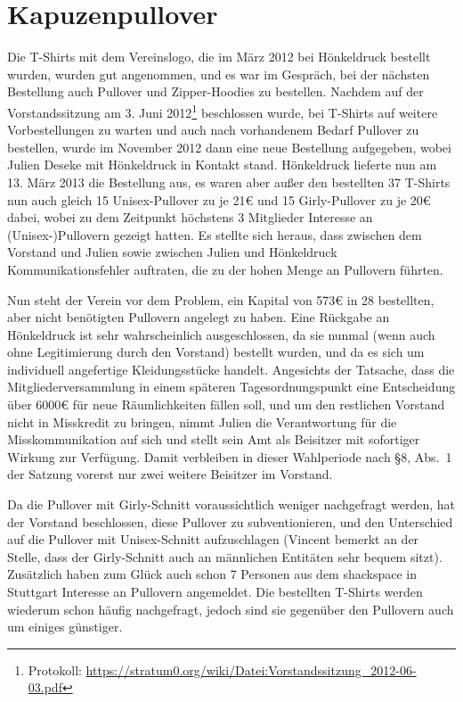 \documentclass[a4paper,12pt]{scrartcl}
\begin{document}
\section{Kapuzenpullover\label{sec:pullover}}
Die T-Shirts mit dem Vereinslogo, die im März 2012 bei Hönkeldruck bestellt
wurden, wurden gut angenommen, und es war im Gespräch, bei der nächsten
Bestellung auch Pullover und Zipper-Hoodies zu bestellen. Nachdem auf der
Vorstandssitzung am 3. Juni 2012\footnote{Protokoll:
\url{https://stratum0.org/wiki/Datei:Vorstandssitzung_2012-06-03.pdf}}
beschlossen wurde, bei T-Shirts auf weitere Vorbestellungen zu warten und auch
nach vorhandenem Bedarf Pullover zu bestellen, wurde im November 2012 dann eine
neue Bestellung aufgegeben, wobei Julien Deseke mit Hönkeldruck in Kontakt
stand.  Hönkeldruck lieferte nun am 13. März 2013 die Bestellung aus, es waren
aber außer den bestellten 37 T-Shirts nun auch gleich 15 Unisex-Pullover zu je
21€ und 15 Girly-Pullover zu je 20€ dabei, wobei zu dem Zeitpunkt höchstens 3
Mitglieder Interesse an (Unisex-)Pullovern gezeigt hatten. Es stellte sich
heraus, dass zwischen dem Vorstand und Julien sowie zwischen Julien und
Hönkeldruck Kommunikationsfehler auftraten, die zu der hohen Menge an Pullovern
führten. 

Nun steht der Verein vor dem Problem, ein Kapital von 573€ in 28 bestellten,
aber nicht benötigten Pullovern angelegt zu haben. Eine Rückgabe an Hönkeldruck
ist sehr wahrscheinlich ausgeschlossen, da sie nunmal (wenn auch ohne
Legitimierung durch den Vorstand) bestellt wurden, und da es sich um individuell
angefertige Kleidungsstücke handelt. Angesichts der Tatsache, dass die
Mitgliederversammlung in einem späteren Tagesordnungspunkt eine Entscheidung
über 6000€ für neue Räumlichkeiten fällen soll, und um den restlichen Vorstand
nicht in Misskredit zu bringen, nimmt Julien die Verantwortung für die
Misskommunikation auf sich und stellt sein Amt als Beisitzer mit sofortiger
Wirkung zur Verfügung. Damit verbleiben in dieser Wahlperiode nach §8, Abs.~1
der Satzung vorerst nur zwei weitere Beisitzer im Vorstand.

Da die Pullover mit Girly-Schnitt voraussichtlich weniger nachgefragt werden,
hat der Vorstand beschlossen, diese Pullover zu subventionieren, und den
Unterschied auf die Pullover mit Unisex-Schnitt aufzuschlagen (Vincent bemerkt
an der Stelle, dass der Girly-Schnitt auch an männlichen Entitäten sehr bequem
sitzt). Zusätzlich haben zum Glück auch schon 7 Personen aus dem shackspace in
Stuttgart Interesse an Pullovern angemeldet. Die bestellten T-Shirts werden
wiederum schon häufig nachgefragt, jedoch sind sie gegenüber den Pullovern auch
um einiges günstiger.
\end{document}
